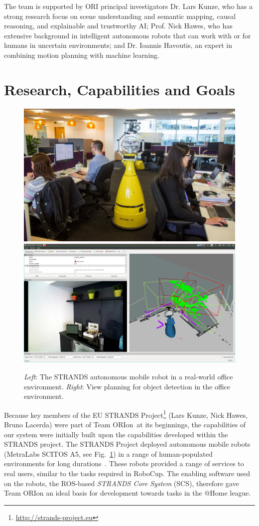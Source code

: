 \documentclass[runningheads,a4paper]{llncs}
\newcommand{\teamori}{Team ORIon}
\begin{document}
The team is supported by ORI principal investigators Dr. Lars Kunze, who has a strong research focus on scene understanding and semantic mapping, causal reasoning, and explainable and trustworthy AI; Prof. Nick Hawes, who has extensive background in intelligent autonomous robots that can work with or for humans in uncertain environments; and Dr. Ioannis Havoutis, an expert in combining motion planning with machine learning.

\section{Research, Capabilities and Goals}

\begin{figure}[tb]
  \begin{center}
    \includegraphics[width=.43\columnwidth]{images/betty.jpg}
    \includegraphics[width=.55\columnwidth,clip,trim=10ex 20ex 10ex 20ex]{images/viewplanning_at_tsc.png}
  \end{center} 
  \vspace{-10pt}  
  \caption{\textit{Left}: The STRANDS autonomous mobile robot in a real-world
  office environment. \textit{Right}: View planning for object detection in the
  office environment.}
  \label{fig:mk}
  \vspace{-3ex}
\end{figure}


Because key members of the EU STRANDS Project\footnote{\url{http://strands-project.eu}} (Lars Kunze, Nick Hawes, Bruno Lacerda) were part of \teamori\ at its beginnings, the capabilities of our system were initially built upon the capabilities developed within the STRANDS project. The STRANDS Project deployed autonomous mobile robots (MetraLabs SCITOS A5, see Fig.~\ref{fig:mk}) in a range of human-populated environments for long durations~\cite{strands@ram}. These robots provided a range of services to real users, similar to the tasks required in RoboCup. The enabling software used on the robots, the ROS-based \emph{STRANDS Core System} (SCS), therefore gave \teamori{} an ideal basis for development towards tasks in the @Home league. 
\end{document}
